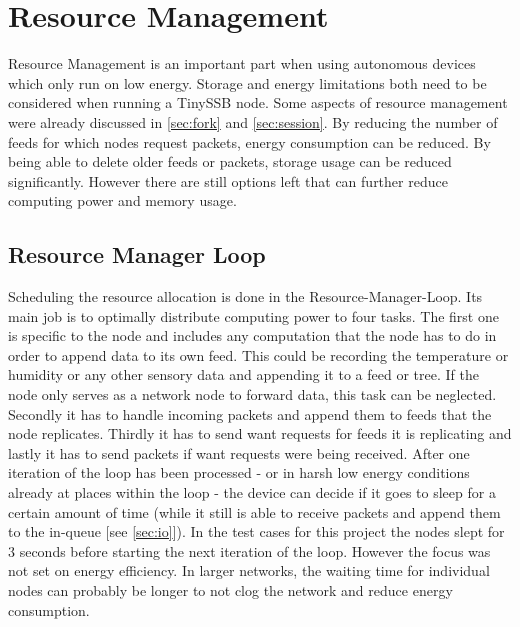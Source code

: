 \chapter{Resource Management}
Resource Management is an important part when using autonomous devices which only run on low energy. Storage and energy limitations both need to be considered when running a TinySSB node. Some aspects of resource management were already discussed in \cref{sec:fork} and \cref{sec:session}. By reducing the number of feeds for which nodes request packets, energy consumption can be reduced. By being able to delete older feeds or packets, storage usage can be reduced significantly.
However there are still options left that can further reduce computing power and memory usage.

\section{Resource Manager Loop}
Scheduling the resource allocation is done in the Resource-Manager-Loop. Its main job is to optimally distribute computing power to four tasks. The first one is specific to the node and includes any computation that the node has to do in order to append data to its own feed. This could be recording the temperature or humidity or any other sensory data and appending it to a feed or tree. If the node only serves as a network node to forward data, this task can be neglected. Secondly it has to handle incoming packets and append them to feeds that the node replicates. Thirdly it has to send want requests for feeds it is replicating and lastly it has to send packets if want requests were being received. After one iteration of the loop has been processed - or in harsh low energy conditions already at places within the loop - the device can decide if it goes to sleep for a certain amount of time (while it still is able to receive packets and append them to the in-queue [see \cref{sec:io}]). In the test cases for this project the nodes slept for 3 seconds before starting the next iteration of the loop. However the focus was not set on energy efficiency. In larger networks, the waiting time for individual nodes can probably be longer to not clog the network and reduce energy consumption.

